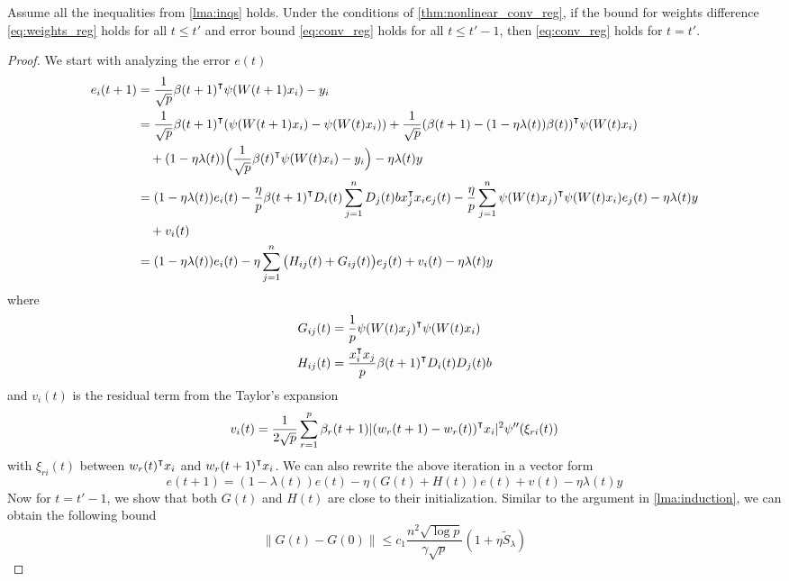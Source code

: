 \begin{lemma}
\label{lma:induction_reg}
Assume all the inequalities from \cref{lma:inqs} holds. Under the conditions of \cref{thm:nonlinear_conv_reg}, if the bound for weights difference \eqref{eq:weights_reg} holds for all $t\leq t'$ and error bound \eqref{eq:conv_reg} holds for all $t\leq t'-1$, then \eqref{eq:conv_reg} holds for $t=t'$.
\end{lemma}
\begin{proof}
We start with analyzing the error $e(t)$
\begin{equation*}
\begin{aligned}
    e_i(t+1)
    &= \frac{1}{\sqrt p}\beta(t+1)\transpose\psi(W(t+1)x_i) - y_i \\
    &= \frac{1}{\sqrt p}\beta(t+1)\transpose(\psi(W(t+1)x_i)-\psi(W(t)x_i))+ \frac{1}{\sqrt p}(\beta(t+1)-(1-\eta\lambda(t))\beta(t))\transpose \psi(W(t)x_i) \\
    & \quad + (1-\eta\lambda(t))\Big(\frac{1}{\sqrt p}\beta(t)\transpose \psi(W(t)x_i) - y_i\Big) - \eta\lambda(t)y \\
    &=(1-\eta\lambda(t))e_i(t) - \frac{\eta}{p}\beta(t+1)\transpose D_i(t)\sum_{j=1}^nD_j(t)b x_j\transpose x_i e_j(t)  - \frac{\eta}{p}\sum_{j=1}^n\psi(W(t)x_j)\transpose\psi(W(t)x_i)e_j(t) - \eta\lambda(t)y\\
    & \quad + v_i(t) \\
    & = (1-\eta\lambda(t))e_i(t)-\eta\sum_{j=1}^n\big(H_{ij}(t)+G_{ij}(t)\big)e_j(t) + v_i(t) - \eta\lambda(t)y
\end{aligned}
\end{equation*}
where
\begin{equation*}
\begin{aligned}
G_{ij}(t) &= \frac{1}{p}\psi(W(t)x_j)\transpose\psi(W(t)x_i) \\
H_{ij}(t) &= \frac{x_i\transpose x_j}{p}\beta(t+1)\transpose D_i(t)D_j(t)b
\end{aligned}
\end{equation*}
and $v_i(t)$ is the residual term from the Taylor's expansion
\begin{equation*}
    v_i(t) = \frac{1}{2\sqrt p}\sum_{r=1}^p\beta_r(t+1)|(w_r(t+1)-w_r(t))\transpose x_i|^2\psi''(\xi_{ri}(t))
\end{equation*}
with $\xi_{ri}(t)$ between $w_r(t)\transpose x_i$ and $w_r(t+1)\transpose x_i$. We can also rewrite the above iteration in a vector form
\begin{equation}\label{eq:et_iter_reg}
     e(t+1) = (1-\lambda(t))e(t) - \eta(G(t)+H(t))e(t) + v(t) -\eta\lambda(t)y
\end{equation}
Now for $t=t'-1$, we show that both $G(t)$ and $H(t)$ are close to their initialization. Similar to the argument in \cref{lma:induction}, we can obtain the following bound
\begin{equation}\label{eq:bound_Gt_reg}
    \|G(t)-G(0)\| \leq c_1 \frac{n^2\sqrt{\log p}}{\gamma\sqrt p}(1+\eta \tilde{S}_\lambda)
\end{equation}


\end{proof}
